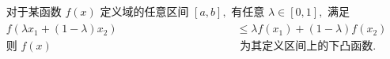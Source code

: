 \documentclass[preview]{standalone}
\begin{document}
\begin{align*}
& \text{对于某函数 } f(x) \text{ 定义域的任意区间 } [a, b], \text{ 有任意 } \lambda \in [0, 1], \text{ 满足} \\ & f(\lambda x_1 + (1 - \lambda) x_2) &\leq \lambda f(x_1) + (1 - \lambda) f(x_2) \\ & \text{则 } f(x) &\text{ 为其定义区间上的下凸函数.}
\end{align*}
\end{document}
